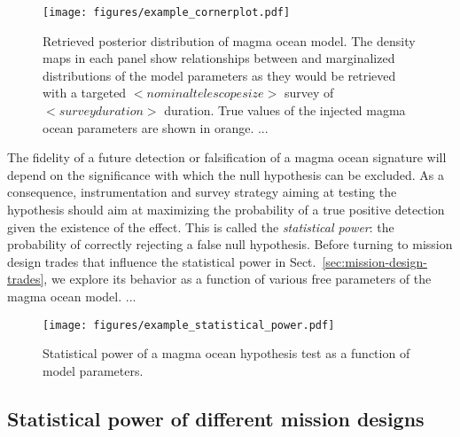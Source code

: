 \documentclass[modern]{aastex631}
\begin{document}
\begin{figure}[ht!]
    \begin{centering}
        \texttt{[image: figures/example\_cornerplot.pdf]}
        \caption{
        Retrieved posterior distribution of magma ocean model. The density maps in each panel show relationships between and marginalized distributions of the model parameters as they would be retrieved with a targeted $<nominal telescope size>$ survey of $<survey duration>$ duration. True values of the injected magma ocean parameters are shown in orange. ...
        }
        \label{fig:cornerplot}
    \end{centering}
\end{figure}



\begin{note}
   The fidelity of a future detection or falsification of a magma ocean signature will depend on the significance with which the null hypothesis can be excluded.
   As a consequence, instrumentation and survey strategy aiming at testing the hypothesis should aim at maximizing the probability of a true positive detection given the existence of the effect.
   This is called the \textit{statistical power}: the probability of correctly rejecting a false null hypothesis.
   Before turning to mission design trades that influence the statistical power in Sect.~\ref{sec:mission-design-trades}, we explore its behavior as a function of various free parameters of the magma ocean model.
    ...
\begin{figure*}[ht!]
    \begin{centering}
        \texttt{[image: figures/example\_statistical\_power.pdf]}
        \caption{
        Statistical power of a magma ocean hypothesis test as a function of model parameters.
        }
        \label{fig:statistical_power}
    \end{centering}
\end{figure*}

\end{note}

\subsection{Statistical power of different mission designs}\label{sec:statpower_missions}
\end{document}
